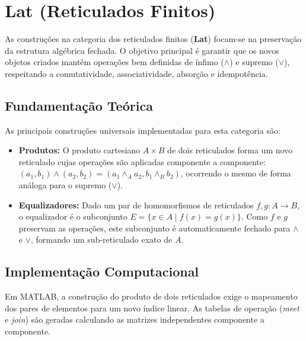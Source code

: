 \section{Lat (Reticulados Finitos)}

As construções na categoria dos reticulados finitos (\textbf{Lat}) focam-se na preservação da estrutura algébrica fechada. O objetivo principal é garantir que os novos objetos criados mantêm operações bem definidas de ínfimo ($\wedge$) e supremo ($\vee$), respeitando a comutatividade, associatividade, absorção e idempotência.

\subsection{Fundamentação Teórica}
As principais construções universais implementadas para esta categoria são:
\begin{itemize}
    \item \textbf{Produtos:} O produto cartesiano $A \times B$ de dois reticulados forma um novo reticulado cujas operações são aplicadas componente a componente: $(a_1, b_1) \wedge (a_2, b_2) = (a_1 \wedge_A a_2, b_1 \wedge_B b_2)$, ocorrendo o mesmo de forma análoga para o supremo ($\vee$).
    \item \textbf{Equalizadores:} Dado um par de homomorfismos de reticulados $f, g: A \to B$, o equalizador é o subconjunto $E = \{x \in A \mid f(x) = g(x)\}$. Como $f$ e $g$ preservam as operações, este subconjunto é automaticamente fechado para $\wedge$ e $\vee$, formando um sub-reticulado exato de $A$.
\end{itemize}

\subsection{Implementação Computacional}
Em MATLAB, a construção do produto de dois reticulados exige o mapeamento dos pares de elementos para um novo índice linear. As tabelas de operação (\emph{meet} e \emph{join}) são geradas calculando as matrizes independentes componente a componente.

